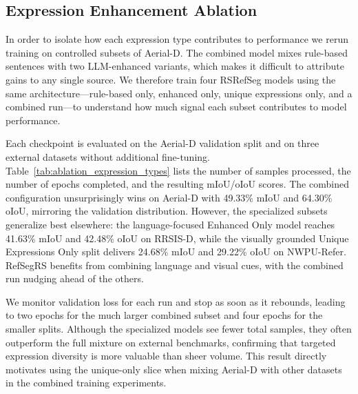 \subsection{Expression Enhancement Ablation}

In order to isolate how each expression type contributes to performance we rerun training on controlled subsets of Aerial-D. The combined model mixes rule-based sentences with two LLM-enhanced variants, which makes it difficult to attribute gains to any single source. We therefore train four RSRefSeg models using the same architecture—rule-based only, enhanced only, unique expressions only, and a combined run—to understand how much signal each subset contributes to model performance.

Each checkpoint is evaluated on the Aerial-D validation split and on three external datasets without additional fine-tuning. Table~\ref{tab:ablation_expression_types} lists the number of samples processed, the number of epochs completed, and the resulting mIoU/oIoU scores. The combined configuration unsurprisingly wins on Aerial-D with 49.33\% mIoU and 64.30\% oIoU, mirroring the validation distribution. However, the specialized subsets generalize best elsewhere: the language-focused Enhanced Only model reaches 41.63\% mIoU and 42.48\% oIoU on RRSIS-D, while the visually grounded Unique Expressions Only split delivers 24.68\% mIoU and 29.22\% oIoU on NWPU-Refer. RefSegRS benefits from combining language and visual cues, with the combined run nudging ahead of the others.

We monitor validation loss for each run and stop as soon as it rebounds, leading to two epochs for the much larger combined subset and four epochs for the smaller splits. Although the specialized models see fewer total samples, they often outperform the full mixture on external benchmarks, confirming that targeted expression diversity is more valuable than sheer volume. This result directly motivates using the unique-only slice when mixing Aerial-D with other datasets in the combined training experiments.

